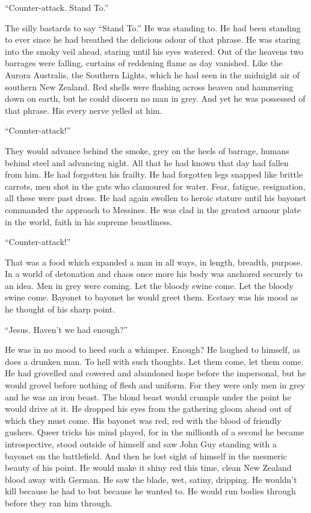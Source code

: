 ``Counter-attack. Stand To.''

The silly bastards to say ``Stand To.'' He was standing to. He had been standing to ever since he had breathed the delicious odour of that phrase. He was staring into the smoky veil ahead, staring until his eyes watered. Out of the heavens two barrages were falling, curtains of reddening flame as day vanished. Like the Aurora Australis, the Southern Lights, which he had seen in the midnight air of southern New Zealand. Red shells were flashing across heaven and hammering down on earth, but he could discern no man in grey. And yet he was possessed of that phrase. His every nerve yelled at him.

``Counter-attack!''

They would advance behind the smoke, grey on the heels of barrage, humans behind steel and advancing night. All that he had known that day had fallen from him. He had forgotten his frailty. He had forgotten legs snapped like brittle carrots, men shot in the guts who clamoured for water. Fear, fatigue, resignation, all these were past dross. He had again swollen to heroic stature until his bayonet commanded the approach to Messines. He was clad in the greatest armour plate in the world, faith in his supreme beastliness.

``Counter-attack!''

That was a food which expanded a man in all ways, in length, breadth, purpose. In a world of detonation and chaos once more his body was anchored securely to an idea. Men in grey were coming. Let the bloody swine come. Let the bloody swine come. Bayonet to bayonet he would greet them. Ecstasy was his mood as he thought of his sharp point.

``Jesus. Haven't we had enough?''

He was in no mood to heed such a whimper. Enough? He laughed to himself, as does a drunken man. To hell with such thoughts. Let them come, let them come. He had grovelled and cowered and abandoned hope before the impersonal, but he would grovel before nothing of flesh and uniform. For they were only men in grey and he was an iron beast. The blond beast would crumple under the point he would drive at it. He dropped his eyes from the gathering gloom ahead out of which they must come. His bayonet was red, red with the blood of friendly gushers. Queer tricks his mind played, for in the millionth of a second he became introspective, stood outside of himself and saw John Guy standing with a bayonet on the battlefield. And then he lost sight of himself in the mesmeric beauty of his point. He would make it shiny red this time, clean New Zealand blood away with German. He saw the blade, wet, satiny, dripping. He wouldn't kill because he had to but because he wanted to. He would run bodies through before they ran him through.

